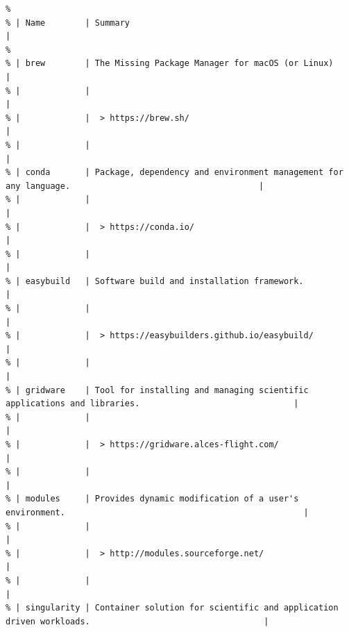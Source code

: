 \begin{verbatim}
% 
% | Name        | Summary                                                                                               |
%
% | brew        | The Missing Package Manager for macOS (or Linux)                                                      |
% |             |                                                                                                       |
% |             |  > https://brew.sh/                                                                                   |
% |             |                                                                                                       |
% | conda       | Package, dependency and environment management for any language.                                      |
% |             |                                                                                                       |
% |             |  > https://conda.io/                                                                                  |
% |             |                                                                                                       |
% | easybuild   | Software build and installation framework.                                                            |
% |             |                                                                                                       |
% |             |  > https://easybuilders.github.io/easybuild/                                                          |
% |             |                                                                                                       |
% | gridware    | Tool for installing and managing scientific applications and libraries.                               |
% |             |                                                                                                       |
% |             |  > https://gridware.alces-flight.com/                                                                 |
% |             |                                                                                                       |
% | modules     | Provides dynamic modification of a user's environment.                                                |
% |             |                                                                                                       |
% |             |  > http://modules.sourceforge.net/                                                                    |
% |             |                                                                                                       |
% | singularity | Container solution for scientific and application driven workloads.                                   |

\end{verbatim}
